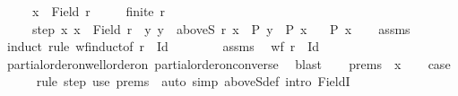 \begin{isabellebody}
\ \ \ \ \ {\isachardoublequoteopen}x\ {\isasymin}\ Field\ r{\isachardoublequoteclose}\isanewline
\ \ \ \ \ {\isachardoublequoteopen}finite\ r{\isachardoublequoteclose}\isanewline
\ \ \ \ \ step{\isacharcolon}{\kern0pt}\ {\isachardoublequoteopen}{\isasymAnd}x{\isachardot}{\kern0pt}\ x\ {\isasymin}\ Field\ r\ {\isasymLongrightarrow}\ {\isacharparenleft}{\kern0pt}{\isasymAnd}y{\isachardot}{\kern0pt}\ y\ {\isasymin}\ aboveS\ r\ x\ {\isasymLongrightarrow}\ P\ y{\isacharparenright}{\kern0pt}\ {\isasymLongrightarrow}\ P\ x{\isachardoublequoteclose}\isanewline
\ \ \ {\isachardoublequoteopen}P\ x{\isachardoublequoteclose}\isanewline
%
\isadelimproof
\ \ %
\endisadelimproof
%
\isatagproof
{}\isamarkupfalse%
\ assms{\isacharparenleft}{\kern0pt}{}{\isacharparenright}{\kern0pt}\isanewline
{}\isamarkupfalse%
\ {\isacharparenleft}{\kern0pt}induct\ rule{\isacharcolon}{\kern0pt}\ wf{\isacharunderscore}{\kern0pt}induct{\isacharbrackleft}{\kern0pt}of\ {\isachardoublequoteopen}r{\isasyminverse}\ {\isacharminus}{\kern0pt}\ Id{\isachardoublequoteclose}{\isacharbrackright}{\kern0pt}{\isacharparenright}{\kern0pt}\isanewline
\ \ \isamarkupfalse%
\ {}\isanewline
\ \ \isamarkupfalse%
\ assms{\isacharparenleft}{\kern0pt}{}{\isacharcomma}{\kern0pt}{}{\isacharparenright}{\kern0pt}\ \isamarkupfalse%
\ {\isachardoublequoteopen}wf\ {\isacharparenleft}{\kern0pt}r{\isasyminverse}\ {\isacharminus}{\kern0pt}\ Id{\isacharparenright}{\kern0pt}{\isachardoublequoteclose}\isanewline
\ \ \ \ \isamarkupfalse%
\ partial{\isacharunderscore}{\kern0pt}order{\isacharunderscore}{\kern0pt}on{\isacharunderscore}{\kern0pt}well{\isacharunderscore}{\kern0pt}order{\isacharunderscore}{\kern0pt}on\ partial{\isacharunderscore}{\kern0pt}order{\isacharunderscore}{\kern0pt}on{\isacharunderscore}{\kern0pt}converse\ \isamarkupfalse%
\ blast\isanewline
{}\isamarkupfalse%
\isanewline
\ \ \isamarkupfalse%
\ prems{\isacharcolon}{\kern0pt}\ {\isacharparenleft}{\kern0pt}{}\ x{\isacharparenright}{\kern0pt}\isanewline
\ \ \isamarkupfalse%
\ {\isacharquery}{\kern0pt}case\isanewline
\ \ \ \ \isamarkupfalse%
\ {\isacharparenleft}{\kern0pt}rule\ step{\isacharparenright}{\kern0pt}\ {\isacharparenleft}{\kern0pt}use\ prems\ \ {\isacartoucheopen}auto\ simp{\isacharcolon}{\kern0pt}\ aboveS{\isacharunderscore}{\kern0pt}def\ intro{\isacharcolon}{\kern0pt}\ FieldI{}{\isacartoucheclose}{\isacharparenright}{\kern0pt}\isanewline

\end{isabellebody}
